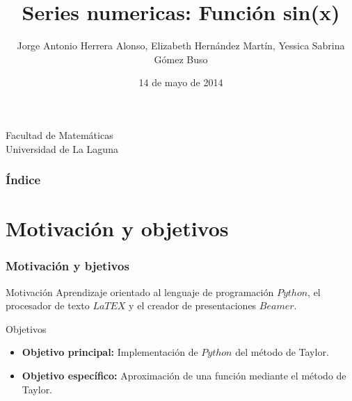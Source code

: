 \documentclass{beamer}
\title[Series numéricas]{Series numericas: Función sin(x)}
\author[Jorge, Elizabeth, Yessica]{Jorge Antonio Herrera Alonso, Elizabeth Hernández Martín, Yessica Sabrina Gómez Buso}
\date[25-03-2014]{14 de mayo de 2014}
\begin{document}
  
\begin{frame}

  \titlepage

  \begin{small}
    \begin{center}
     Facultad de Matemáticas \\
     Universidad de La Laguna
    \end{center}
  \end{small}

\end{frame}

\begin{frame}
  \frametitle{Índice}  
  \tableofcontents[pausesections]
\end{frame}

 

\section{Motivación y objetivos}
\begin{frame}
\frametitle{Motivación y bjetivos}
\begin{block}{Motivación}
Aprendizaje orientado al lenguaje de programación $Python$, el procesador de texto $LaTEX$ y el creador de presentaciones $Beamer$.
\end{block}
\begin{block}{Objetivos}
  \begin{itemize}
  \item {\bf Objetivo principal:} Implementación de $Python$ del método de Taylor.\pause
  \item {\bf Objetivo específico:} Aproximación de una función mediante el método de Taylor.
  \end{itemize}
\end{block}


\end{frame}
\end{document}
